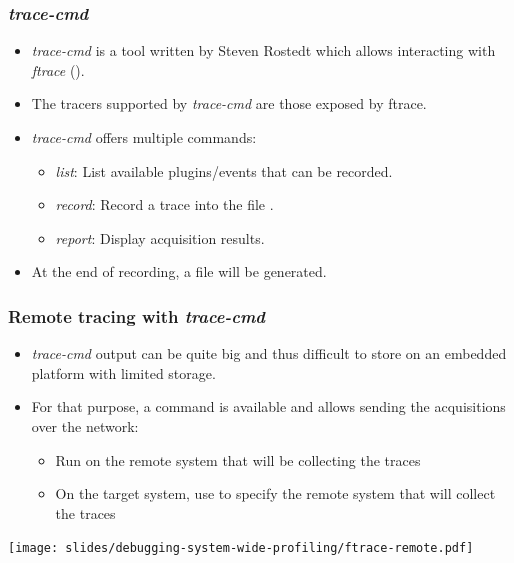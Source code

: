 \begin{frame}
  \frametitle{{\em trace-cmd}}
  \begin{itemize}
    \item {\em trace-cmd} is a tool written by Steven Rostedt which allows
          interacting with {\em ftrace} ().
    \item The tracers supported by {\em trace-cmd} are those exposed by ftrace.
    \item {\em trace-cmd} offers multiple commands:
    \begin{itemize}
      \item {\em list}: List available plugins/events that can be recorded.
      \item {\em record}: Record a trace into the file .
      \item {\em report}: Display  acquisition results.
    \end{itemize}
    \item At the end of recording, a  file will be generated.
  \end{itemize}
\end{frame}

\begin{frame}
  \frametitle{Remote tracing with {\em trace-cmd}}
  \begin{itemize}
    \item {\em trace-cmd} output can be quite big and thus difficult to
          store on an embedded platform with limited storage.
    \item For that purpose, a  command is available and allows sending
          the acquisitions over the network:
    \begin{itemize}
      \item Run  on the remote system that will
            be collecting the traces
      \item On the target system, use 
            to specify the remote system that will collect the traces
    \end{itemize}
  \end{itemize}
  \center\texttt{[image: slides/debugging-system-wide-profiling/ftrace-remote.pdf]}
\end{frame}

